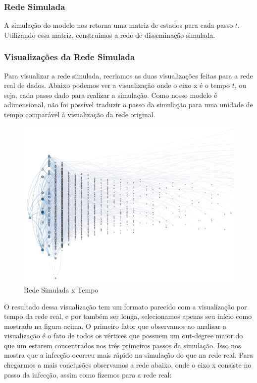 \documentclass[a4paper,12pt]{article}
\begin{document}
\subsubsection{Rede Simulada}

A simulação do modelo nos retorna uma matriz de estados para cada passo $t$. Utilizando essa matriz, construímos a rede de disseminação simulada.

\subsubsection{Visualizações da Rede Simulada}

Para visualizar a rede simulada, recriamos as duas visualizações feitas para a rede real de dados. Abaixo podemos ver a visualização
onde o eixo x é o tempo $t$, ou seja, cada passo dado para realizar a simulação. Como nosso modelo é adimensional, não foi 
possível traduzir o passo da simulação para uma unidade de tempo comparável à visualização da rede original.


\begin{figure}[ht]
 \centering
 \includegraphics[scale=0.8]{../results/simul.png}
 \caption{Rede Simulada x Tempo}
\end{figure}

O resultado dessa visualização tem um formato parecido com a visualização por tempo da rede real, e por também ser longa, selecionamos 
apenas seu início como mostrado na figura acima. O primeiro fator que observamos ao analisar a visualização é o fato de todos os vértices
que possuem um out-degree maior do que um estarem concentrados nos três primeiros passos da simulação. Isso nos mostra que a infecção ocorreu
mais rápido na simulação do que na rede real. Para chegarmos a mais conclusões observamos a rede abaixo, onde o eixo x consiste no passo da
infecção, assim como fizemos para a rede real:
\end{document}
